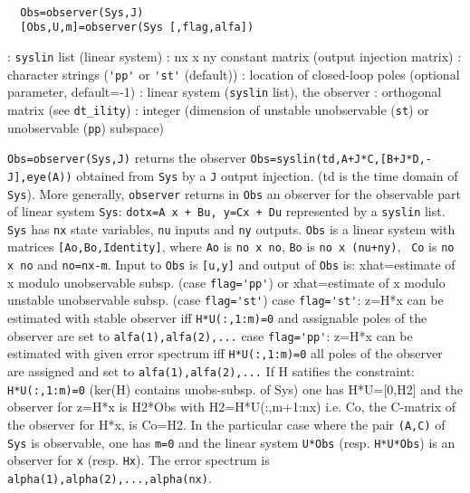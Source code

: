 \begin{mandesc}
   \\ %
\end{mandesc}
\begin{calling_sequence}
\begin{verbatim}
  Obs=observer(Sys,J)  
  [Obs,U,m]=observer(Sys [,flag,alfa])  
\end{verbatim}
\end{calling_sequence}
\begin{parameters}
  \begin{varlist}
    : \verb!syslin! list (linear system)
    : nx x ny constant matrix (output injection matrix)
    : character strings (\verb!'pp'! or \verb!'st'! (default))
    : location of closed-loop poles (optional parameter, default=-1)
    : linear system (\verb!syslin! list), the observer
    : orthogonal matrix (see \verb!dt_ility!)
    : integer (dimension of unstable unobservable (\verb!st!)  or unobservable  (\verb!pp!) subspace)
  \end{varlist}
\end{parameters}
\begin{mandescription}
  \verb!Obs=observer(Sys,J)! returns the observer 
  \verb!Obs=syslin(td,A+J*C,[B+J*D,-J],eye(A))! obtained from \verb!Sys! 
  by a \verb!J! output injection. (td is the time domain of \verb!Sys!).
  More generally, \verb!observer! returns in \verb!Obs! an observer for 
  the observable part of linear system 
  \verb!Sys!: \verb!dotx=A x + Bu, y=Cx + Du!  represented by a \verb!syslin! list.
  \verb!Sys! has \verb!nx! state variables, \verb!nu! inputs and \verb!ny! outputs.
  \verb!Obs! is a linear system with matrices \verb![Ao,Bo,Identity]!, 
  where \verb!Ao! is \verb!no x no!, \verb!Bo! is \verb!no x (nu+ny)!, \verb! Co! is
  \verb!no x no! and \verb!no=nx-m!.
  Input to \verb!Obs! is \verb![u,y]! and output of \verb!Obs! is:
  xhat=estimate of x modulo unobservable subsp. (case \verb!flag='pp'!)
  or
  xhat=estimate of x modulo unstable unobservable subsp. (case \verb!flag='st'!)
  case \verb!flag='st'!:
  z=H*x can be estimated with stable observer iff \verb!H*U(:,1:m)=0!
  and assignable poles of the observer are set to \verb!alfa(1),alfa(2),...!
  case \verb!flag='pp'!:
  z=H*x can be estimated with given error spectrum iff \verb!H*U(:,1:m)=0! 
  all poles of the observer are assigned and set to \verb!alfa(1),alfa(2),...!
  If H satifies the constraint: \verb!H*U(:,1:m)=0!  (ker(H) contains unobs-subsp.
  of Sys) one has H*U=[0,H2] and the observer for 
  z=H*x is H2*Obs with H2=H*U(:,m+1:nx) i.e. Co, the C-matrix of the
  observer for H*x, is Co=H2.
  In the particular case where the pair \verb!(A,C)! of \verb!Sys! is 
  observable, one has \verb!m=0! and the linear system \verb!U*Obs! (resp.
  \verb!H*U*Obs!) is an observer for \verb!x! (resp. \verb!Hx!). 
  The error spectrum is \verb!alpha(1),alpha(2),...,alpha(nx)!.
\end{mandescription}
